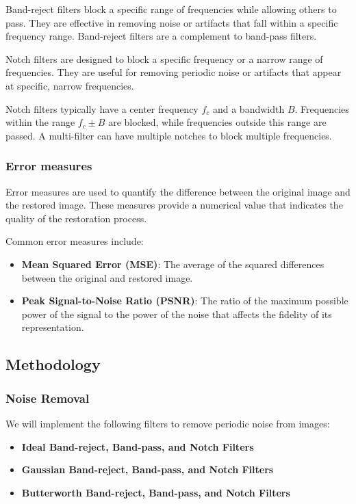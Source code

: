 \documentclass[a4paper,12pt]{article}
\begin{document}
Band-reject filters block a specific range of frequencies while allowing others to pass. They are effective in removing noise or artifacts that fall within a specific frequency range. Band-reject filters are a complement to band-pass filters.

Notch filters are designed to block a specific frequency or a narrow range of frequencies. They are useful for removing periodic noise or artifacts that appear at specific, narrow frequencies.

Notch filters typically have a center frequency \( f_c \) and a bandwidth \( B \). Frequencies within the range \( f_c \pm B \) are blocked, while frequencies outside this range are passed. A multi-filter can have multiple notches to block multiple frequencies.

\subsubsection{Error measures}

Error measures are used to quantify the difference between the original image and the restored image. These measures provide a numerical value that indicates the quality of the restoration process.

Common error measures include:

\begin{itemize}
    \item \textbf{Mean Squared Error (MSE)}: The average of the squared differences between the original and restored image.
    \item \textbf{Peak Signal-to-Noise Ratio (PSNR)}: The ratio of the maximum possible power of the signal to the power of the noise that affects the fidelity of its representation.
\end{itemize}

\subsection{Methodology}

\subsubsection{Noise Removal}

We will implement the following filters to remove periodic noise from images:

\begin{itemize}
    \item \textbf{Ideal Band-reject, Band-pass, and Notch Filters}
    \item \textbf{Gaussian Band-reject, Band-pass, and Notch Filters}
    \item \textbf{Butterworth Band-reject, Band-pass, and Notch Filters}
\end{itemize}
\end{document}
